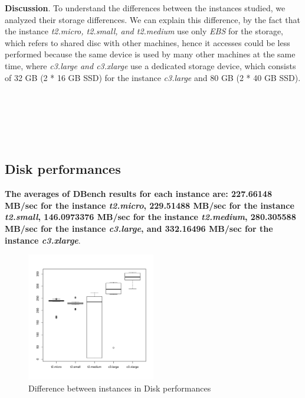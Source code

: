 \documentclass[10pt, conference]{IEEEtran}
\begin{document}
\textbf{Discussion}. To understand the differences between the instances studied, we analyzed their storage differences. We can explain this difference, by the fact that the instance \textit{t2.micro, t2.small, and t2.medium} use only \textit{EBS} for the storage, which refers to shared disc with other machines, hence it accesses could be less performed because the same device is used by many other machines at the same time, where \textit{c3.large and c3.xlarge} use a dedicated storage device, which consists of 32 GB (2 * 16 GB SSD) for the instance \textit{c3.large} and 80 GB (2 * 40 GB SSD).

\

\noindent{}

\

\

\subsection{Disk performances}

\textbf{The averages of DBench results for each instance are: 227.66148 MB/sec for the instance \textit{t2.micro}, 229.51488 MB/sec for the instance \textit{t2.small}, 146.0973376 MB/sec for the instance \textit{t2.medium}, 280.305588 MB/sec for the instance \textit{c3.large}, and 332.16496 MB/sec for the instance \textit{c3.xlarge}}.


\begin{figure}
\includegraphics[width=0.5\textwidth]{plots/dbench2.pdf}
\caption{Difference between instances in Disk performances}
\label{fig:dbench2}
\end{figure}
\end{document}
